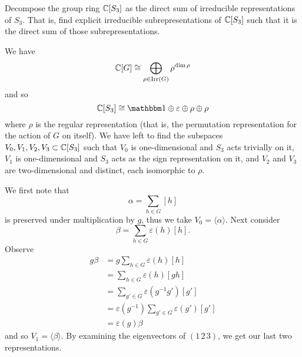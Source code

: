 \question Decompose the group ring $\mathbb C[S_3]$ as the direct sum of irreducible representations of $S_3$. That is, find explicit irreducible subrepresentations of $\mathbb C[S_3]$ such that it is the direct sum of those subrepresentations. 
\begin{solution}
    We have
    \[ \mathbb C[G] \cong \bigoplus_{\rho \in \operatorname{Irr}(G)} \rho^{\dim \rho} \]
    and so 
    \[ \C[S_3] \cong \triv \oplus \varepsilon \oplus \rho \oplus \rho \]
    where $\rho$ is the regular representation (that is, the permutation representation for the action of $G$ on itself). We have left to find the subspaces $V_0, V_1, V_2, V_3 \subset \mathbb C[S_3]$ such that $V_0$ is one-dimensional and $S_3$ acts trivially on it, $V_1$ is one-dimensional and $S_3$ acts as the sign representation on it, and $V_2$ and $V_3$ are two-dimensional and distinct, each isomorphic to $\rho$.

    We first note that
    \[ \alpha = \sum_{h \in G} [h] \]
    is preserved under multiplication by $g$, thus we take $V_0 = \langle \alpha \rangle$. Next consider
    \[ \beta = \sum_{h \in G} \varepsilon(h) [h]. \]
    Observe
    \begin{align*}
        g\beta &= g\sum_{h \in G} \varepsilon(h) [h]\\
        &= \sum_{h \in G} \varepsilon(h) [gh] \\
        &= \sum_{g' \in G} \varepsilon(g^{-1}g') [g'] \\
        &= \varepsilon(g^{-1}) \sum_{g' \in G} \varepsilon(g') [g'] \\
        &= \varepsilon(g) \beta
    \end{align*}
    and so $V_1 = \langle \beta \rangle$. By examining the eigenvectors of $(1\,2\,3)$, we get our last two representations. 
\end{solution}

